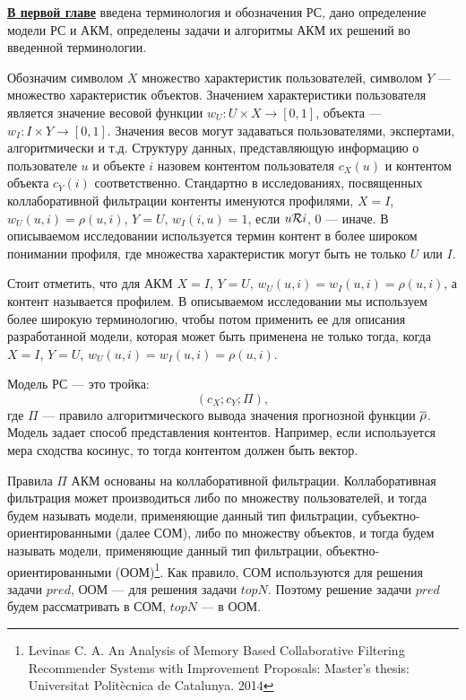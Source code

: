 
{\underline {\bf В первой главе}} введена терминология и обозначения РС,
дано определение модели РС и АКМ,
определены задачи и алгоритмы АКМ их решений во введенной терминологии.

Обозначим символом $X$ множество характеристик
пользователей, символом $Y$ --- множество характеристик объектов.
Значением характеристики пользователя
является значение весовой функции $w_U: U \times X \rightarrow[0,1]$,
объекта --- $w_I: I \times Y \rightarrow[0,1]$. Значения весов могут задаваться
пользователями, экспертами, алгоритмически и т.д. Структуру данных,
представляющую информацию о пользователе $u$ и объекте $i$ назовем
контентом пользователя $c_X(u)$ и контентом объекта $c_Y(i)$ соответственно.
Стандартно в исследованиях, посвященных коллаборативной фильтрации
контенты именуются профилями, $X = I$, $w_U(u, i) = \rho(u, i)$,
$Y = U$, $w_I(i, u) = 1$, если $u \mathcal{R} i$, 0 --- иначе. В описываемом
исследовании используется термин контент в более широком понимании
профиля, где множества характеристик могут быть не только $U$
или $I$.

Стоит отметить, что для АКМ $X = I$, $Y = U$,  $w_U(u, i) = w_I(u, i) = \rho(u,
i)$, а контент называется профилем. В описываемом исследовании мы используем
более широкую терминологию, чтобы потом применить ее для описания разработанной
модели, которая может быть применена не только тогда, когда
$X = I$, $Y = U$,  $w_U(u, i) = w_I(u, i) = \rho(u,i)$.

Модель РС --- это тройка:
\begin{equation}
	(c_X; c_Y; \Pi),
\end{equation} где
$\Pi$ --- правило алгоритмического вывода значения прогнозной функции $\overline{\rho}$.
Модель задает способ представления контентов. Например, если используется
мера сходства косинус, то тогда контентом должен быть вектор.

Правила $\Pi$ АКМ основаны на коллаборативной фильтрации.
Коллаборативная фильтрация может производиться либо по множеству
пользователей,
и тогда будем называть модели, применяющие данный тип фильтрации,
субъектно-ориентированными (далее СОМ),
либо по множеству объектов,
и тогда будем называть модели, применяющие данный тип фильтрации,
объектно-ориентированными (ООМ)\footnote{Levinas C. A.
An Analysis of Memory Based Collaborative Filtering
Recommender Systems with Improvement Proposals: Master’s thesis: Universitat
Politècnica de Catalunya. 2014}. Как правило, СОМ используются для решения
задачи $pred$, ООМ --- для решения задачи $topN$. Поэтому
решение задачи $pred$ будем рассматривать в СОМ, $topN$ --- в ООМ.

